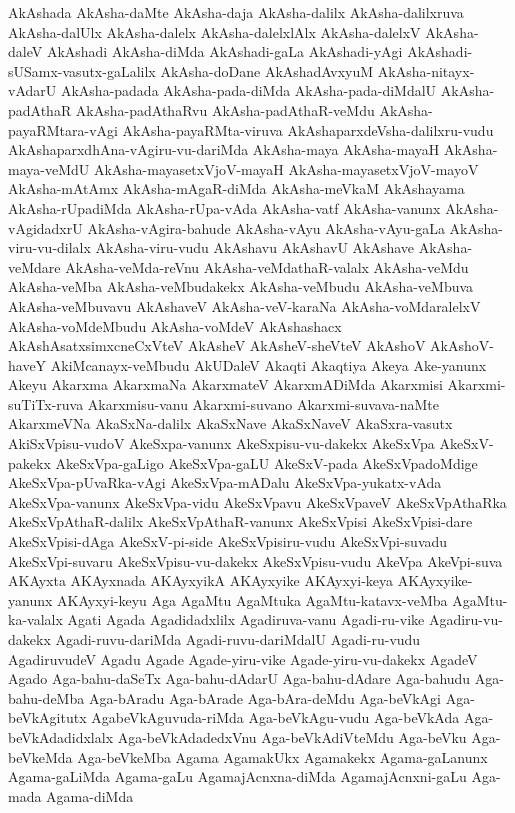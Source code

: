 {AkAshada
AkAsha-daMte
AkAsha-daja
AkAsha-dalilx
AkAsha-dalilxruva
AkAsha-dalUlx
AkAsha-dalelx
AkAsha-dalelxlAlx
AkAsha-dalelxV
AkAsha-daleV
AkAshadi
AkAsha-diMda
AkAshadi-gaLa
AkAshadi-yAgi
AkAshadi-sUSamx-vasutx-gaLalilx
AkAsha-doDane
AkAshadAvxyuM
AkAsha-nitayx-vAdarU
AkAsha-padada
AkAsha-pada-diMda
AkAsha-pada-diMdalU
AkAsha-padAthaR
AkAsha-padAthaRvu
AkAsha-padAthaR-veMdu
AkAsha-payaRMtara-vAgi
AkAsha-payaRMta-viruva
AkAshaparxdeVsha-dalilxru-vudu
AkAshaparxdhAna-vAgiru-vu-dariMda
AkAsha-maya
AkAsha-mayaH
AkAsha-maya-veMdU
AkAsha-mayasetxVjoV-mayaH
AkAsha-mayasetxVjoV-mayoV
AkAsha-mAtAmx
AkAsha-mAgaR-diMda
AkAsha-meVkaM
AkAshayama
AkAsha-rUpadiMda
AkAsha-rUpa-vAda
AkAsha-vatf
AkAsha-vanunx
AkAsha-vAgidadxrU
AkAsha-vAgira-bahude
AkAsha-vAyu
AkAsha-vAyu-gaLa
AkAsha-viru-vu-dilalx
AkAsha-viru-vudu
AkAshavu
AkAshavU
AkAshave
AkAsha-veMdare
AkAsha-veMda-reVnu
AkAsha-veMdathaR-valalx
AkAsha-veMdu
AkAsha-veMba
AkAsha-veMbudakekx
AkAsha-veMbudu
AkAsha-veMbuva
AkAsha-veMbuvavu
AkAshaveV
AkAsha-veV-karaNa
AkAsha-voMdaralelxV
AkAsha-voMdeMbudu
AkAsha-voMdeV
AkAshashacx
AkAshAsatxsimxcneCxVteV
AkAsheV
AkAsheV-sheVteV
AkAshoV
AkAshoV-haveY
AkiMcanayx-veMbudu
AkUDaleV
Akaqti
Akaqtiya
Akeya
Ake-yanunx
Akeyu
Akarxma
AkarxmaNa
AkarxmateV
AkarxmADiMda
Akarxmisi
Akarxmi-suTiTx-ruva
Akarxmisu-vanu
Akarxmi-suvano
Akarxmi-suvava-naMte
AkarxmeVNa
AkaSxNa-dalilx
AkaSxNave
AkaSxNaveV
AkaSxra-vasutx
AkiSxVpisu-vudoV
AkeSxpa-vanunx
AkeSxpisu-vu-dakekx
AkeSxVpa
AkeSxV-pakekx
AkeSxVpa-gaLigo
AkeSxVpa-gaLU
AkeSxV-pada
AkeSxVpadoMdige
AkeSxVpa-pUvaRka-vAgi
AkeSxVpa-mADalu
AkeSxVpa-yukatx-vAda
AkeSxVpa-vanunx
AkeSxVpa-vidu
AkeSxVpavu
AkeSxVpaveV
AkeSxVpAthaRka
AkeSxVpAthaR-dalilx
AkeSxVpAthaR-vanunx
AkeSxVpisi
AkeSxVpisi-dare
AkeSxVpisi-dAga
AkeSxV-pi-side
AkeSxVpisiru-vudu
AkeSxVpi-suvadu
AkeSxVpi-suvaru
AkeSxVpisu-vu-dakekx
AkeSxVpisu-vudu
AkeVpa
AkeVpi-suva
AKAyxta
AKAyxnada
AKAyxyikA
AKAyxyike
AKAyxyi-keya
AKAyxyike-yanunx
AKAyxyi-keyu
Aga
AgaMtu
AgaMtuka
AgaMtu-katavx-veMba
AgaMtu-ka-valalx
Agati
Agada
Agadidadxlilx
Agadiruva-vanu
Agadi-ru-vike
Agadiru-vu-dakekx
Agadi-ruvu-dariMda
Agadi-ruvu-dariMdalU
Agadi-ru-vudu
AgadiruvudeV
Agadu
Agade
Agade-yiru-vike
Agade-yiru-vu-dakekx
AgadeV
Agado
Aga-bahu-daSeTx
Aga-bahu-dAdarU
Aga-bahu-dAdare
Aga-bahudu
Aga-bahu-deMba
Aga-bAradu
Aga-bArade
Aga-bAra-deMdu
Aga-beVkAgi
Aga-beVkAgitutx
AgabeVkAguvuda-riMda
Aga-beVkAgu-vudu
Aga-beVkAda
Aga-beVkAdadidxlalx
Aga-beVkAdadedxVnu
Aga-beVkAdiVteMdu
Aga-beVku
Aga-beVkeMda
Aga-beVkeMba
Agama
AgamakUkx
Agamakekx
Agama-gaLanunx
Agama-gaLiMda
Agama-gaLu
AgamajAcnxna-diMda
AgamajAcnxni-gaLu
Aga-mada
Agama-diMda
}
